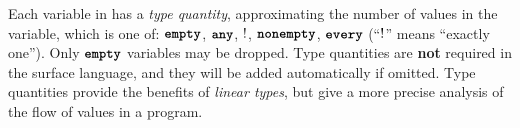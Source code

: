 \documentclass[nonacm, dvipsnames, sigconf]{acmart}
\begin{document}
Each variable in \langName has a \emph{type quantity}, approximating the number of values in the variable, which is one of: $\textbf{\texttt{empty}}$, $\textbf{\texttt{any}}$, $!$, $\textbf{\texttt{nonempty}}$, $\textbf{\texttt{every}}$ (``$!$'' means ``exactly one'').
Only $\textbf{\texttt{empty}}$ \assetTxt variables may be dropped. %
Type quantities are \textbf{not} required in the surface language, and they will be added automatically if omitted. %
Type quantities provide the benefits of \emph{linear types}, but give a more precise analysis of the flow of values in a program.
\end{document}
